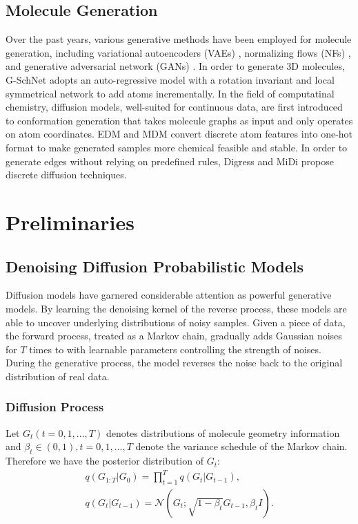 \documentclass[letterpaper]{article}
\begin{document}
\subsection{Molecule Generation}
Over the past years, various generative methods have been employed for molecule generation, including variational autoencoders (VAEs) \cite{vae_13_kingma}, normalizing flows (NFs) \cite{nice_15_dinh}, and generative adversarial network (GANs) \cite{gan_14_goodfellow}. In order to generate 3D molecules, G-SchNet \cite{gschnet_19_wallach} adopts an auto-regressive model with a rotation invariant and local symmetrical network to add atoms incrementally.
In the field of computatinal chemistry, diffusion models, well-suited for continuous data, are first introduced to conformation generation that takes molecule graphs as input and only operates on atom coordinates.
EDM \cite{edm_22_hoogeboom} and MDM \cite{mdm_23_huang} convert discrete atom features into one-hot format to make generated samples more chemical feasible and stable. In order to generate edges without relying on predefined rules, Digress \cite{digress_22_vignac} and MiDi \cite{midi_23_vignac} propose discrete diffusion techniques.





\section{Preliminaries}
\subsection{Denoising Diffusion Probabilistic Models}
Diffusion models have garnered considerable attention as powerful generative models. By learning the denoising kernel of the reverse process, these models are able to uncover underlying distributions of noisy samples. Given a piece of data, the forward process, treated as a Markov chain, gradually adds Gaussian noises for $T$ times to with learnable parameters controlling the strength of noises. During the generative process, the model reverses the noise back to the original distribution of real data.

\subsubsection{Diffusion Process}
Let $G_t (t=0, 1, ..., T)$ denotes distributions of molecule geometry information and $\beta_t \in (0, 1), t=0, 1, ..., T$ denote the variance schedule of the Markov chain. Therefore we have the posterior distribution of $G_t$:
\begin{eqnarray}
&q(G_{1:T} | G_0) = \prod^T_{t=1} q(G_t | G_{t-1}), &\\
&q(G_t | G_{t-1}) = \mathcal{N}(G_t; \sqrt{1-\beta_t}G_{t-1}, \beta_t I).&
\end{eqnarray}
\end{document}

